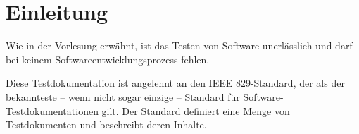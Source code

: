 

\chapter{Einleitung}
Wie in der Vorlesung erwähnt, ist das Testen von Software unerlässlich und darf
bei keinem Softwareentwicklungsprozess fehlen.

Diese Testdokumentation ist angelehnt an den IEEE 829-Standard, der als
der bekannteste -- wenn nicht sogar einzige -- Standard für Software-
Testdokumentationen gilt. Der Standard definiert eine Menge von Testdokumenten
und beschreibt deren Inhalte. 